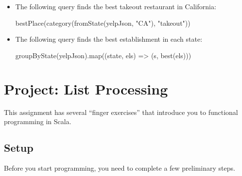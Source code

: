 \documentclass[9pt]{extbook}
\begin{document}
\begin{itemize}
\item The following query finds the best takeout restaurant in California:
    \begin{scalacode}
    bestPlace(category(fromState(yelpJson, "CA"), "takeout"))
    \end{scalacode}

\item The following query finds the best establishment in each state:
    \begin{scalacode}
    groupByState(yelpJson).map((state, els) => (s, best(els)))
    \end{scalacode}
\end{itemize}



\chapter{Project: List Processing}

This assignment has several ``finger exercises'' that introduce you
to functional programming in Scala.

\section{Setup}

Before you start programming, you need to complete a few preliminary steps.
\end{document}
